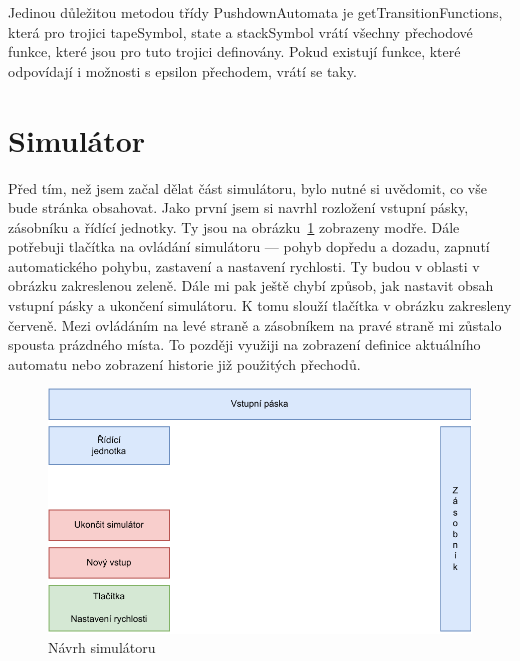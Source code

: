 Jedinou důležitou metodou třídy PushdownAutomata je getTransitionFunctions, která pro trojici tapeSymbol, state a stackSymbol vrátí všechny přechodové funkce, které jsou pro tuto trojici definovány. Pokud existují funkce, které odpovídají i možnosti s epsilon přechodem, vrátí se taky.

\section{Simulátor}

Před tím, než jsem začal dělat část simulátoru, bylo nutné si uvědomit, co vše bude stránka obsahovat. Jako první jsem si navrhl rozložení vstupní pásky, zásobníku a řídící jednotky. Ty jsou na obrázku~\ref{fig:SimulatorPageDesign} zobrazeny modře. Dále potřebuji tlačítka na ovládání simulátoru --- pohyb dopředu a dozadu, zapnutí automatického pohybu, zastavení a nastavení rychlosti. Ty budou v oblasti v obrázku zakreslenou zeleně. Dále mi pak ještě chybí způsob, jak nastavit obsah vstupní pásky a ukončení simulátoru. K tomu slouží tlačítka v obrázku zakresleny červeně. Mezi ovládáním na levé straně a zásobníkem na pravé straně mi zůstalo spousta prázdného místa. To později využiji na zobrazení definice aktuálního automatu nebo zobrazení historie již použitých přechodů.

\begin{figure}[h]
    \centering
    \includegraphics{Figures/SimulatoPageDesign.drawio.pdf}
    \caption{Návrh simulátoru}\label{fig:SimulatorPageDesign}
\end{figure}

